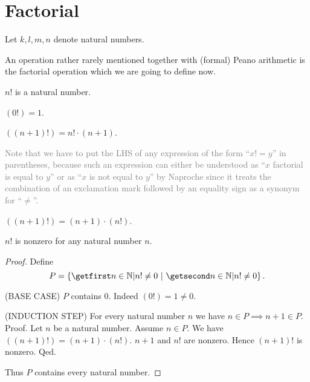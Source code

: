 \documentclass[../../arithmetic.tex]{subfiles}
\begin{document}
  \section{Factorial}

  \begin{forthel}
  \end{forthel}

  \begin{forthel}
    Let $k, l, m, n$ denote natural numbers.
  \end{forthel}

  \noindent An operation rather rarely mentioned together with (formal) Peano
  arithmetic is the factorial operation which we are going to define now.

  \begin{forthel}
    \begin{signature}
      $n!$ is a natural number.
    \end{signature}

    \begin{axiom}\label{Arithmetic_01_05_169222}
      $(0!) = 1$.
    \end{axiom}

    \begin{axiom}\label{Arithmetic_01_05_539010}
      $((n + 1)!) = n! \cdot (n + 1)$.
    \end{axiom}
  \end{forthel}

  \noindent \textcolor{gray}{Note that we have to put the LHS of any expression
  of the form \enquote{$x! = y$} in parentheses, because such an expression can
  either be understood as \enquote{$x$ factorial is equal to $y$} or as
  \enquote{$x$ is not equal to $y$} by Naproche since it treats the combination
  of an exclamation mark followed by an equality sign as a synonym for
  \enquote{$\neq$}.}

  \begin{forthel}
    \begin{lemma}\label{Arithmetic_01_05_692846}
      $((n + 1)!) = (n + 1) \cdot (n!)$.
    \end{lemma}

    \begin{proposition}\label{Arithmetic_01_05_473272}
      $n!$ is nonzero for any natural number $n$.
    \end{proposition}
    \begin{proof}
      Define \[ P = \class{n \in \Nat | n! \neq 0}. \]

      (BASE CASE) $P$ contains $0$.
      Indeed $(0!) = 1 \neq 0$.

      (INDUCTION STEP) For every natural number $n$ we have $n \in P \implies n + 1 \in P$. \\
      Proof.
        Let $n$ be a natural number.
        Assume $n \in P$.
        We have $((n + 1)!) = (n + 1) \cdot (n!)$.
        $n + 1$ and $n!$ are nonzero.
        Hence $(n + 1)!$ is nonzero.
      Qed.

      Thus $P$ contains every natural number.
    \end{proof}
  \end{forthel}
\end{document}
